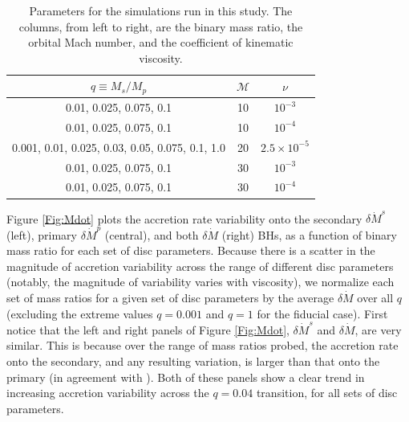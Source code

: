 \documentclass[usenatbib]{mnras}
\begin{document}
  
  

\begin{table}
\begin{center}
\begin{tabular}{ c | c | c }
        $ q\equiv M_s/M_p   $                       & $\mathcal{M}$    & $\nu$ 		  \\
                   \hline 
0.01, 0.025, 0.075, 0.1                                      & 10      & $10^{-3}$      \\
 0.01, 0.025, 0.075, 0.1                                     & 10      & $10^{-4}$    \\
0.001, 0.01, 0.025, 0.03, 0.05, 0.075, 0.1, 1.0                 & 20      & $2.5 \times 10^{-5}$    \\
0.01, 0.025, 0.075, 0.1                                      &  30      & $10^{-3}$   \\
0.01, 0.025, 0.075, 0.1                                      &  30      & $10^{-4}$    
 \end{tabular}
\caption{Parameters for the simulations run in this study. The
  columns, from left to right, are the binary mass ratio, the orbital
  Mach number, and the coefficient of kinematic viscosity.}
\label{Table:sims}
\end{center}
\end{table}




Figure \ref{Fig:Mdot} plots the accretion rate variability onto the
secondary $\delta \dot{M}^s$ (left), primary $\delta \dot{M}^p$
(central), and both $\delta \dot{M}$ (right) BHs, as a function of
binary mass ratio for each set of disc parameters. Because there is a
scatter in the magnitude of accretion variability across the range of
different disc parameters (notably, the magnitude of variability
varies with viscosity), we normalize each set of mass ratios for a
given set of disc parameters by the average $\delta \dot{M}$ over all
$q$ (excluding the extreme values $q=0.001$ and $q=1$ for the fiducial
case). First notice that the left and right panels of Figure
\ref{Fig:Mdot}, $\delta \dot{M}^s$ and $\delta \dot{M}$, are very
similar. This is because over the range of mass ratios probed, the
accretion rate onto the secondary, and any resulting variation, is
larger than that onto the primary (in agreement with
\citealt{Farris:2014}). Both of these panels show a clear trend in
increasing accretion variability across the $q=0.04$ transition, for
all sets of disc parameters.
\end{document}
